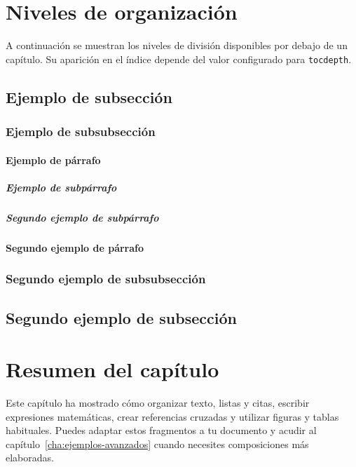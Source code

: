 \section{Niveles de organización}
\label{sec:niveles-organizacion}

A continuación se muestran los niveles de división disponibles por debajo de un capítulo. Su aparición en el índice depende del valor configurado para \texttt{tocdepth}.


\subsection{Ejemplo de subsección}
\label{sec:subseccion}


\subsubsection{Ejemplo de subsubsección}
\label{sec:subsubseccion}

\paragraph{Ejemplo de párrafo}
\label{sec:paragraph-1}


\subparagraph{Ejemplo de subpárrafo}
\label{sec:subparagraph}

\subparagraph{Segundo ejemplo de subpárrafo}
\label{sec:subparagraph-2}

\paragraph{Segundo ejemplo de párrafo}
\label{sec:paragraph-2}

\subsubsection{Segundo ejemplo de subsubsección}
\label{sec:subsubseccion-2}

\subsection{Segundo ejemplo de subsección}
\label{sec:subseccion-2}



\section{Resumen del capítulo}
\label{sec:resumen-elementos-basicos}

Este capítulo ha mostrado cómo organizar texto, listas y citas, escribir expresiones matemáticas, crear referencias cruzadas y utilizar figuras y tablas habituales. Puedes adaptar estos fragmentos a tu documento y acudir al capítulo~\ref{cha:ejemplos-avanzados} cuando necesites composiciones más elaboradas.








